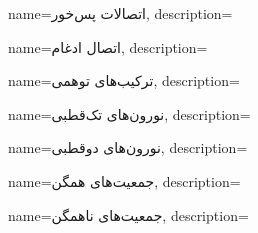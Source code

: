 {
name={اتصالات پس‌خور},
description=\hfill{}
}

{
name={اتصال ادغام},
description=\hfill{}
}

{
name={ترکیب‌های توهمی},
description=\hfill{}
}

{
	name={نورون‌های تک‌قطبی},
	description=\hfill{}
}

{
	name={نورون‌های دوقطبی},
	description=\hfill{}
}

{
name={جمعیت‌های همگن},
description=\hfill{}
}

{
name={جمعیت‌های ناهمگن},
description=\hfill{}
}

%
%


